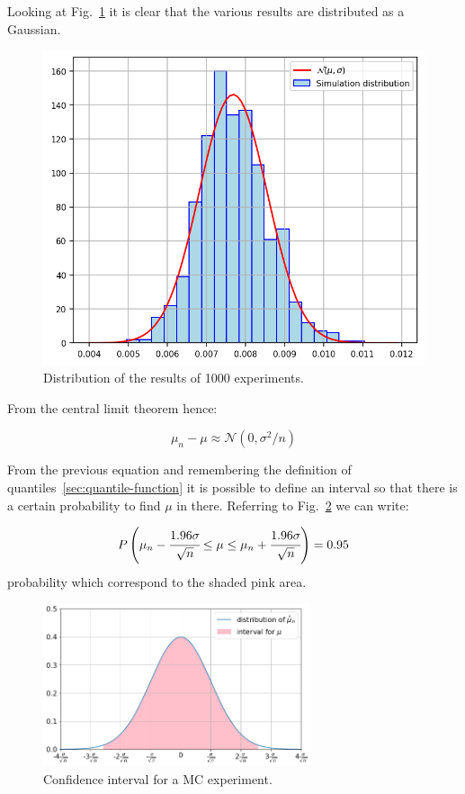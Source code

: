 Looking at Fig.~\ref{fig:repeated_MC} it is clear that the various results are distributed as a Gaussian.

\begin{figure}[htb]
\centering
\includegraphics[width=1\textwidth]{figures/experiment_distribution}
\caption{Distribution of the results of 1000 experiments.}
\label{fig:repeated_MC}
\end{figure}

From the central limit theorem hence: 

\begin{equation}
\mu_n - \mu \approx \mathcal{N}(0, \sigma^2/n)
\end{equation}

From the previous equation and remembering the definition of  quantiles~\ref{sec:quantile-function} it is possible to define an interval so that there is a certain probability to find $\mu$ in there. Referring to Fig.~\ref{fig:confidence_interval} we can write:

\begin{equation}
P\left(\mu_n - \cfrac{1.96\sigma}{\sqrt{n}}\le \mu \le \mu_n + \cfrac{1.96\sigma}{\sqrt{n}}\right) = 0.95
\end{equation}
probability which correspond to the shaded pink area.

\begin{figure}[htb]
	\centering
	\includegraphics[width=0.7\textwidth]{figures/confidence_interval}
	\caption{Confidence interval for a MC experiment.}
	\label{fig:confidence_interval}
\end{figure}

